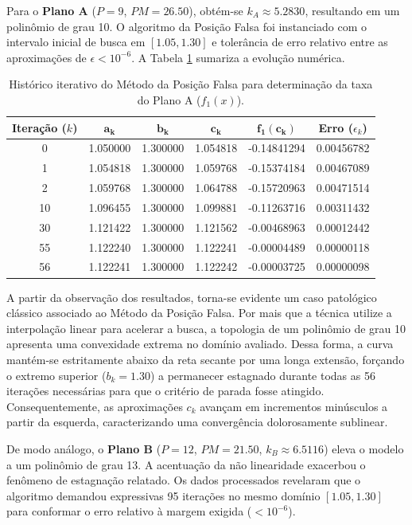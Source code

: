 Para o \textbf{Plano A} ($P = 9$, $PM = 26.50$), obtém-se $k_A \approx 5.2830$, resultando em um polinômio de grau 10. O algoritmo da Posição Falsa foi instanciado com o intervalo inicial de busca em $[1.05, 1.30]$ e tolerância de erro relativo entre as aproximações de $\epsilon < 10^{-6}$. A Tabela \ref{tab:posicao_falsa_juros_f1} sumariza a evolução numérica.

\begin{table}[htpb]
\centering
\caption{Histórico iterativo do Método da Posição Falsa para determinação da taxa do Plano A ($f_1(x)$).}
\label{tab:posicao_falsa_juros_f1}
\small
\begin{tabular}{@{}cccccc@{}}
\toprule
\textbf{Iteração ($k$)} & $\mathbf{a_k}$ & $\mathbf{b_k}$ & $\mathbf{c_k}$ & $\mathbf{f_1(c_k)}$ & \textbf{Erro} ($\epsilon_k$) \\ \midrule
0  & 1.050000 & 1.300000 & 1.054818 & -0.14841294 & 0.00456782 \\
1  & 1.054818 & 1.300000 & 1.059768 & -0.15374184 & 0.00467089 \\
2  & 1.059768 & 1.300000 & 1.064788 & -0.15720963 & 0.00471514 \\
10 & 1.096455 & 1.300000 & 1.099881 & -0.11263716 & 0.00311432 \\
30 & 1.121422 & 1.300000 & 1.121562 & -0.00468963 & 0.00012442 \\
55 & 1.122240 & 1.300000 & 1.122241 & -0.00004489 & 0.00000118 \\
56 & 1.122241 & 1.300000 & 1.122242 & -0.00003725 & 0.00000098 \\ \bottomrule
\end{tabular}
\end{table}

A partir da observação dos resultados, torna-se evidente um caso patológico clássico associado ao Método da Posição Falsa. Por mais que a técnica utilize a interpolação linear para acelerar a busca, a topologia de um polinômio de grau 10 apresenta uma convexidade extrema no domínio avaliado. Dessa forma, a curva mantém-se estritamente abaixo da reta secante por uma longa extensão, forçando o extremo superior ($b_k = 1.30$) a permanecer estagnado durante todas as 56 iterações necessárias para que o critério de parada fosse atingido. Consequentemente, as aproximações $c_k$ avançam em incrementos minúsculos a partir da esquerda, caracterizando uma convergência dolorosamente sublinear.

De modo análogo, o \textbf{Plano B} ($P = 12$, $PM = 21.50$, $k_B \approx 6.5116$) eleva o modelo a um polinômio de grau 13. A acentuação da não linearidade exacerbou o fenômeno de estagnação relatado. Os dados processados revelaram que o algoritmo demandou expressivas 95 iterações no mesmo domínio $[1.05, 1.30]$ para conformar o erro relativo à margem exigida ($< 10^{-6}$).

